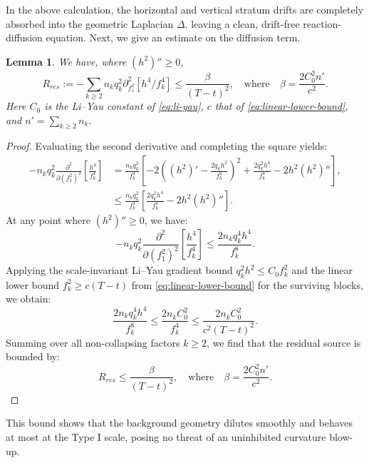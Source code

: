 \documentclass[11pt]{amsart}
\theoremstyle{plain}
\numberwithin{equation}{section}
\newtheorem{lemma}[theorem]{Lemma}
\theoremstyle{definition}
\theoremstyle{remark}
\begin{document}
In the above calculation, the horizontal and vertical stratum drifts are completely absorbed into the geometric Laplacian $\Delta$, leaving a clean, drift-free reaction-diffusion equation. Next, we give an estimate on the diffusion term.  

\begin{lemma} \label{lem:residual-source-bound}
	We have, where $(h^2)'' \ge 0$,
	\[R_{res} := -\sum_{k \ge 2} n_k q_k^2 \partial^2_{f_1^2} [ h^4/f_k^4 ] \le \frac{\beta}{(T-t)^2}, \quad \text{where} \quad \beta = \frac{2C_0^2 n'}{c^2}.\]
	Here $C_0$ is the Li--Yau constant of \eqref{eq:li-yau}, $c$ that of \eqref{eq:linear-lower-bound}, and $n' = \sum_{k \geq 2} n_k$.
\end{lemma}
\begin{proof}
Evaluating the second derivative and completing the square yields:
\begin{align*}
	-n_k q_k^2 \frac{\partial^2}{\partial (f_1^2)^2} \left[ \frac{h^4}{f_k^4} \right] &= \frac{n_k q_k^2}{f_k^4} \left[ -2 \left( (h^2)' - \frac{2q_k h^2}{f_k^2} \right)^2 + \frac{2q_k^2 h^4}{f_k^4} - 2h^2(h^2)'' \right],\\
	&\leq \frac{n_k q_k^2}{f_k^4} \left[ \frac{2q_k^2 h^4}{f_k^4} - 2h^2(h^2)'' \right].
\end{align*}
At any point where $(h^2)'' \ge 0$, we have:
\begin{equation}
	-n_k q_k^2 \frac{\partial^2}{\partial (f_1^2)^2} \left[ \frac{h^4}{f_k^4} \right] \le \frac{2 n_k q_k^4 h^4}{f_k^8}.
\end{equation}
Applying the scale-invariant Li--Yau gradient bound $q_k^2 h^2 \le C_0 f_k^2$ and the linear lower bound $f_k^2 \ge c(T-t)$ from  \eqref{eq:linear-lower-bound} for the surviving blocks, we obtain:
\begin{equation}
	\frac{2 n_k q_k^4 h^4}{f_k^8} \le \frac{2 n_k C_0^2}{f_k^4} \le \frac{2 n_k C_0^2}{c^2 (T-t)^2}.
\end{equation}
Summing over all non-collapsing factors $k \ge 2$, we find that the residual source is bounded by:
\begin{equation}
	R_{res} \le \frac{\beta}{(T-t)^2}, \quad \text{where} \quad \beta = \frac{2C_0^2 n'}{c^2}.
\end{equation}
	
\end{proof}
This bound shows that the background geometry dilutes smoothly and behaves at most at the Type I scale, posing no threat of an uninhibited curvature blow-up.
\end{document}

